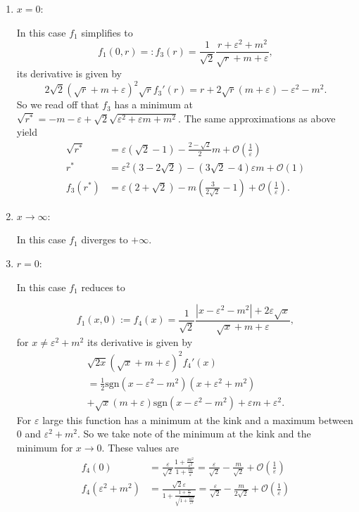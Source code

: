 \documentclass[b5paper,draft,openbib,12pt]{memoir}
\begin{document}
\begin{enumerate}[label=case \alph*),]
\item \(x=0\):

In this case \(f_1\) simplifies to
\begin{equation*}
f_1(0,r)=:f_3(r)=\frac{1}{\sqrt{2}} \frac{r+\varepsilon^2+m^2}{\sqrt{r}+m+\varepsilon},
\end{equation*}
its derivative is given by
\begin{equation*}
2\sqrt{2}(\sqrt{r}+m+\varepsilon)^2 \sqrt{r} f_3'(r)=r + 2 \sqrt{r}(m+\varepsilon) - \varepsilon^2-m^2.
\end{equation*}
So we read off that \(f_3\) has a minimum at \(\sqrt{r^*}=-m-\varepsilon + \sqrt{2} \sqrt{\varepsilon^2+\varepsilon m+m^2}\).
The same approximations as above yield
\begin{align}\tag*{}
\sqrt{r^*}&=\varepsilon (\sqrt{2}-1)- \frac{2-\sqrt{2}}{2} m + \mathcal{O}\left( \frac{1}{\varepsilon}\right)\\\tag*{}
r^*&= \varepsilon^2 (3-2\sqrt{2}) - (3\sqrt{2}  - 4) \varepsilon m + \mathcal{O}(1)\\
f_3(r^*)&= \varepsilon (2+ \sqrt{2}) - m \left( \frac{3}{2\sqrt{2}} -1 \right) + \mathcal{O}\left( \frac{1}{\varepsilon}\right).
\end{align}

\item \(x\rightarrow \infty\):

In this case \(f_1\) diverges to \(+\infty\).

\item \(r=0\):

In this case \(f_1\) reduces to

\begin{equation*}
f_1(x,0):=f_4(x)= \frac{1}{\sqrt{2}} \frac{ |x-\varepsilon^2-m^2| + 2 \varepsilon \sqrt{x}}{\sqrt{x}+m+\varepsilon},
\end{equation*}
for \(x\neq \varepsilon^2+m^2\) its derivative is given by
\begin{multline*}
\sqrt{2x} (\sqrt{x}+m+\varepsilon)^2 f_4'(x)\\
= \frac{1}{2}\text{sgn}(x-\varepsilon^2-m^2)(x+\varepsilon^2+m^2)\\
+\sqrt{x} (m+\varepsilon) \text{sgn}(x-\varepsilon^2-m^2) + \varepsilon m + \varepsilon^2.
\end{multline*}
For \(\varepsilon\) large this function has a minimum at the
 kink and a maximum between 0 and \(\varepsilon^2+m^2\).  So
 we take note of the minimum at the kink and
  the minimum for \(x\rightarrow 0\). These values are
\begin{align}
f_4(0)&= \frac{\varepsilon}{\sqrt{2}} \frac{1+\frac{m^2}{\varepsilon^2}}{1+\frac{m}{\varepsilon}}= \frac{\varepsilon}{\sqrt{2}} - \frac{m}{\sqrt{2}}+ \mathcal{O}\left(\frac{1}{\varepsilon}\right)\\
f_4(\varepsilon^2+m^2)&=
\frac{\sqrt{2} \varepsilon }{1+ \frac{1+ \frac{m}{\varepsilon}}{\sqrt{1+\frac{m^2}{\varepsilon^2}}}}= \frac{\varepsilon}{\sqrt{2}} - \frac{m}{2\sqrt{2}} + \mathcal{O}\left(\frac{1}{\varepsilon}\right)
\end{align}
 

\end{enumerate}
\end{document}
